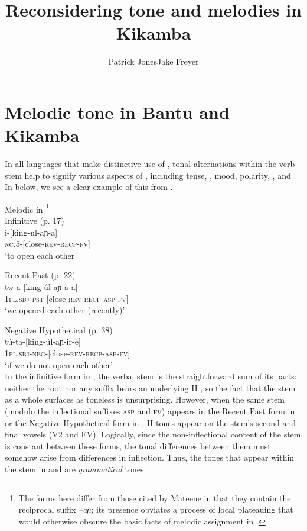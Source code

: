 \documentclass[output=paper,newtxmath,modfonts,nonflat,draft]{langsci/langscibook}
\title{Reconsidering tone and melodies in Kikamba}
\author{Patrick Jones\affiliation{University of South Florida}\lastand Jake Freyer\affiliation{Brandeis University}}
\begin{document}
\maketitle

\section{Melodic tone in Bantu and Kikamba}\label{sec:jones:1}

In all  languages that make distinctive use of , tonal alternations within the verb stem help to signify various aspects of , including tense, , mood, polarity, , and  \citep{Bickmore2014}. In  below, we see a clear example of this from  \citep{Mateene1992}.


\ea\label{ex:jones:1}
Melodic  in  \citep{Mateene1992}\footnote{The forms here differ from those cited by Mateene in that they contain the reciprocal suffix \textit{–aɲ}; its presence obviates a process of local  plateauing that would otherwise obscure the basic facts of melodic  assignment in .}\\
\ea\label{ex:jones:1a}
Infinitive (p. 17)\\
\gll   i-[king-ul-aɲ-a]\\
       \textsc{nc}.5-[close-\textsc{rev}-\textsc{recp}-\textsc{fv}]\footnotemark\\
\glt   ‘to open each other’  


\ex\label{ex:jones:1b}
{Recent Past (p. 22)}\\
\gll   tw-a-[king-úl-aɲ-a-a]    \\
       \textsc{1pl.sbj}-\textsc{pst}-[close-\textsc{rev}-\textsc{recp}-\textsc{asp}-\textsc{fv}]\\
\glt ‘we opened each other (recently)’

\ex\label{ex:jones:1c}
{Negative Hypothetical (p. 38)}\\
\gll   tú-ta-[king-úl-aɲ-ir-é]\\
      \textsc{1pl.sbj-neg-[}close\textsc{-rev-recp-asp-fv]}\\
\glt ‘if we do not open each other’\\
\z
\z
In the infinitive form in , the verbal stem is the straightforward sum of its parts: neither the root nor any suffix bears an underlying H , so the fact that the stem as a whole surfaces as toneless is unsurprising. However, when the same stem (modulo the inflectional suffixes \textsc{asp} and \textsc{fv}) appears in the Recent Past form in  or the Negative Hypothetical form in , H tones appear on the stem’s second and final vowels (V2 and FV). Logically, since the non-inflectional content of the stem is constant between these forms, the tonal differences between them must somehow arise from differences in inflection. Thus, the tones that appear within the stem in  and  are \textit{grammatical} tones.
\end{document}
